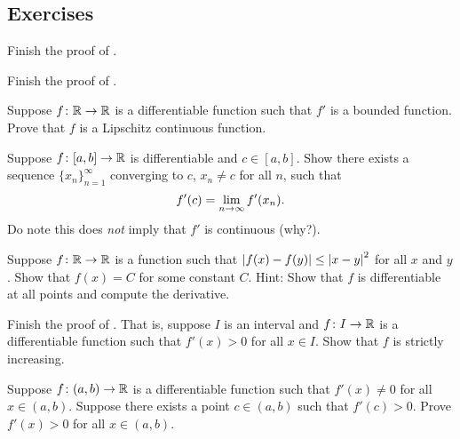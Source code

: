 \subsection{Exercises}

\begin{exercise}
Finish the proof of .
\end{exercise}

\begin{exercise}
Finish the proof of .
\end{exercise}

\begin{exercise} \label{exercise:boundeddermeanslip}
Suppose $f \colon {\mathbb{R}} \to {\mathbb{R}}$ is a differentiable
function such that $f'$ is a bounded function.  Prove
that $f$ is a Lipschitz continuous function.
\end{exercise}

\begin{exercise}
\pagebreak[1]
Suppose $f \colon [a,b] \to {\mathbb{R}}$ is differentiable and $c \in [a,b]$.
Show there exists a sequence $\{ x_n \}_{n=1}^\infty$ converging to $c$, $x_n
\not= c$ for all $n$, such that
\begin{equation*}
f'(c) = \lim_{n\to \infty} f'(x_n).
\avoidbreak
\end{equation*}
Do note this does \emph{not} imply that $f'$ is continuous (why?).
\end{exercise}

\begin{exercise}
Suppose $f \colon {\mathbb{R}} \to {\mathbb{R}}$ is a function such that
$\left\lvert {f(x)-f(y)} \right\rvert \leq \left\lvert {x-y} \right\rvert^2$ for all $x$ and $y$.  Show that
$f(x) = C$ for some constant $C$.  Hint: Show that $f$ is differentiable
at all points and compute the derivative.
\end{exercise}

\begin{exercise} \label{exercise:posderincr}
Finish the proof of .  That is,
suppose $I$ is an interval and
$f \colon I \to {\mathbb{R}}$ is a differentiable function such that
$f'(x) > 0$ for all $x \in I$.
Show that $f$ is strictly increasing.
\end{exercise}

\begin{exercise}
Suppose $f \colon (a,b) \to {\mathbb{R}}$ is a differentiable function
such that
$f'(x) \not= 0$ for all $x \in (a,b)$.  Suppose there
exists
a point $c \in (a,b)$ such that $f'(c) > 0$.
Prove $f'(x) > 0$ for all $x \in (a,b)$.
\end{exercise}

